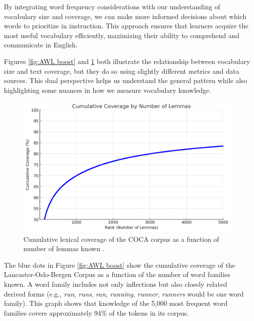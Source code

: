 By integrating word frequency considerations with our understanding of vocabulary size and coverage, we can make more informed decisions about which words to prioritize in instruction. This approach ensures that learners acquire the most useful vocabulary efficiently, maximizing their ability to comprehend and communicate in English.

Figures \ref{fig:AWL boost} and \ref{fig:lemma-coverage} both illustrate the relationship between vocabulary size and text coverage, but they do so using slightly different metrics and data sources. This dual perspective helps us understand the general pattern while also highlighting some nuances in how we measure vocabulary knowledge.


\begin{figure}
    \centering
    \includegraphics[width=0.8\linewidth]{figures/cumulative-lemmas.png}
    \caption{Cumulative lexical coverage of the COCA corpus as a function of number of lemmas known \citep{wordfrequency_info}.}
    \label{fig:lemma-coverage}
\end{figure}

The blue dots in Figure \ref{fig:AWL boost} show the cumulative coverage of the Lancaster-Oslo-Bergen Corpus as a function of the number of word families known. A word family includes not only inflections but also closely related derived forms (e.g., \textit{run}, \textit{runs}, \textit{ran}, \textit{running}, \textit{runner}, \textit{runners} would be one word family). This graph shows that knowledge of the 5,000 most frequent word families covers approximately 94\% of the tokens in its corpus.

